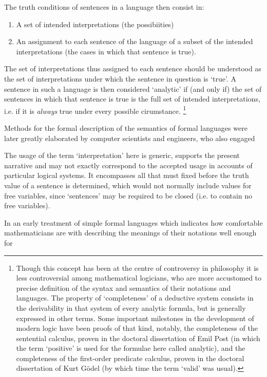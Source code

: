 \documentclass[10pt,titlepage]{book}
\begin{document}
The truth conditions of sentences in a language then consist in:

\begin{enumerate}
\item A set of intended interpretations (the possibiities)
  \item An assignment to each sentence of the language of a subset of the intended interpretations (the cases in which that sentence is true).
\end{enumerate}

The set of interpretations thus assigned to each sentence should be understood as the set of interpretations under which the sentence in question is `true'.
A sentence in such a language is then considered `analytic' if (and only if) the set of sentences in which that sentence is true is the full set of intended interpretations, i.e. if it is \emph{always} true under every possible cirumstance.
\footnote{
Though this concept has been at the centre of controversy in philosophy it is less controversial among mathematical logicians, who are more accustomed to precise definition of the syntax and semantics of their notations and languages.
The property of `completeness' of a deductive system consists in the derivability in that system of every analytic formula, but is generally expressed in other terms.
Some important milestones in the development of modern logic have been proofs of that kind, notably, the completeness of the sentential calculus, proven in the doctoral dissertation of Emil Post \cite{post21}(in which the term `positive' is used for the formulae here called analytic), and the completeness of the first-order predicate calculus, proven in the doctoral dissertation of Kurt G\"{o}del \cite{godel30a} (by which time the term `valid' was usual).
}

Methods for the formal description of the semantics of formal languages were later greatly elaborated by computer scientists and engineers, who also engaged 


The usage of the term `interpretation' here is generic, supports the present narrative and may not exactly correspond to the accepted usage in accounts of particular logical systems.
It encompasses all that must fixed before the truth value of a sentence is determined, which would not normally include values for free variables, since `sentences' may be required to be closed (i.e. to contain no free variables).

In an early treatment of simple formal languages which indicates how comfortable mathematicians are with describing the meanings of their notations well enough for 
\end{document}
